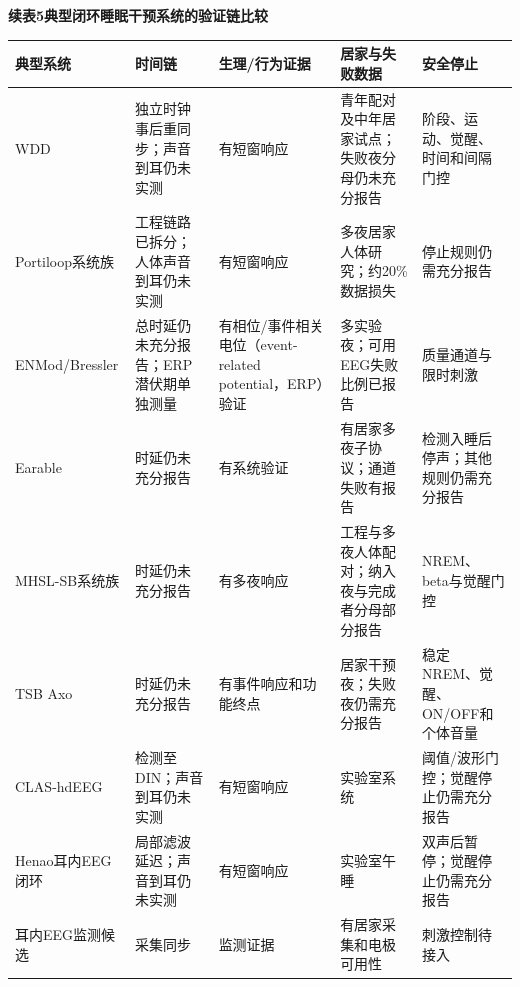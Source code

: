 \documentclass[UTF8,zihao=5,fontset=none]{ctexart}
\begin{document}
\begin{center}
\begin{minipage}{\textwidth}
\centering

\fontsize{7.5pt}{9pt}\selectfont

\setlength{\tabcolsep}{1.8pt}

\vspace{2pt}

{\bfseries 续表5\quad 典型闭环睡眠干预系统的验证链比较}\par

\vspace{2pt}

\begin{tabularx}{\textwidth}{>{\raggedright\arraybackslash}p{}>{\raggedright\arraybackslash}X>{\raggedright\arraybackslash}p{}>{\raggedright\arraybackslash}p{}>{\raggedright\arraybackslash}p{}}

\hline

典型系统 & 时间链 & 生理/行为证据 & 居家与失败数据 & 安全停止 \\

\hline

WDD & 独立时钟事后重同步；声音到耳仍未实测 & 有短窗响应 & 青年配对及中年居家试点；失败夜分母仍未充分报告 & 阶段、运动、觉醒、时间和间隔门控 \\

Portiloop系统族 & 工程链路已拆分；人体声音到耳仍未实测 & 有短窗响应 & 多夜居家人体研究；约20\%数据损失 & 停止规则仍需充分报告 \\

ENMod/Bressler & 总时延仍未充分报告；ERP潜伏期单独测量 & 有相位/事件相关电位（event-related potential，ERP）验证 & 多实验夜；可用EEG失败比例已报告 & 质量通道与限时刺激 \\

Earable & 时延仍未充分报告 & 有系统验证 & 有居家多夜子协议；通道失败有报告 & 检测入睡后停声；其他规则仍需充分报告 \\

MHSL-SB系统族 & 时延仍未充分报告 & 有多夜响应 & 工程与多夜人体配对；纳入夜与完成者分母部分报告 & NREM、beta与觉醒门控 \\

TSB Axo & 时延仍未充分报告 & 有事件响应和功能终点 & 居家干预夜；失败夜仍需充分报告 & 稳定NREM、觉醒、ON/OFF和个体音量 \\

CLAS-hdEEG & 检测至DIN；声音到耳仍未实测 & 有短窗响应 & 实验室系统 & 阈值/波形门控；觉醒停止仍需充分报告 \\

Henao耳内EEG闭环 & 局部滤波延迟；声音到耳仍未实测 & 有短窗响应 & 实验室午睡 & 双声后暂停；觉醒停止仍需充分报告 \\

耳内EEG监测候选 & 采集同步 & 监测证据 & 有居家采集和电极可用性 & 刺激控制待接入 \\

\hline

\end{tabularx}

\end{minipage}
\end{center}
\end{document}

